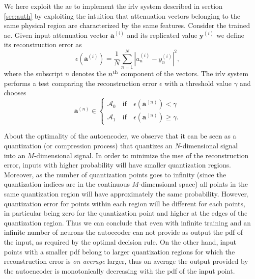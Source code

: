 \documentclass[draftcls,onecolumn,12pt]{IEEEtran}
\begin{document}
We here exploit the \ac{ae} to implement the \ac{irlv} system described in section \ref{sec:auth} by exploiting the intuition that attenuation vectors belonging to the same physical region are characterized by the same features. Consider the trained \ac{ae}. Given input attenuation vector $\bm{a}^{(i)}$ and its replicated value $\bm{y}^{(i)}$ we define its reconstruction error as
\begin{equation}\label{eq: rec err}
    \epsilon(\bm{a}^{(i)}) = \frac{1}{N}\sum_{n=1}^{N}|a^{(i)}_n-y^{(i)}_n|^2,
\end{equation}
where the subscript $n$ denotes the $n^{\rm th}$ component of the vectors. The \ac{irlv} system performs a test comparing the reconstruction error $\epsilon$ with a threshold value $\gamma$ and chooses 
\begin{equation}
\bm{a}^{(n)} \in
\begin{cases}
\mathcal{A}_0 \quad \text{if} \quad \epsilon(\bm{a}^{(n)}) < \gamma \\
\mathcal{A}_1 \quad \text{if} \quad \epsilon(\bm{a}^{(n)}) \ge \gamma. 
\end{cases}
\end{equation}

About the optimality of the autoencoder, we observe that it can be seen as a quantization (or compression process) that quantizes an $N$-dimensional signal into an $M$-dimensional signal. In order to minimize the \ac{mse} of the reconstruction error, inputs with higher probability will have smaller quantization regions. Moreover, as the number of quantization points goes to infinity (since the quantization indices are in the continuous $M$-dimensional space) all points in the same quantization region will have approximately the same probability. However, quantization error for points within each region will be different for each points, in particular being zero for the quantization point and higher at the edges of the quantization region. Thus we can conclude that even with infinite training and an infinite number of neurons the autoecoder can not provide as output the \ac{pdf} of the input, as required by the optimal decision rule. On the other hand, input points with a smaller \ac{pdf} belong to larger quantization regions for which the reconstruction error is {\em on average} larger, thus on average the output provided by the autoencoder is monotonically decreasing with the \ac{pdf} of the input point. 
\end{document}
